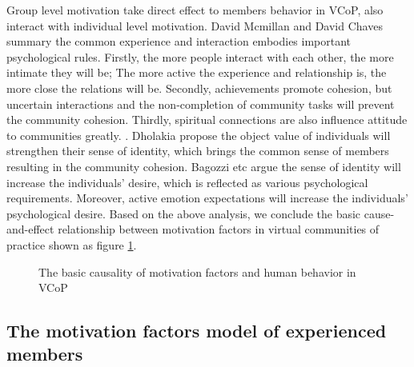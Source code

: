 \documentclass{elsarticle}
\begin{document}
 Group  level motivation take direct effect to members behavior in
 VCoP,  also interact with individual
level motivation. David Mcmillan and David
Chaves summary  the common experience and interaction embodies
important psychological rules. Firstly, the more people interact with each
other, the more intimate they will be; The more active the experience
and relationship is, the more close the relations will
be. Secondly, achievements promote cohesion, but uncertain
interactions and the non-completion of community tasks will prevent
the community cohesion. Thirdly, spiritual connections are also
influence attitude to communities greatly. 
\cite{mcmillan1986scd}. Dholakia propose the object value of individuals will
strengthen their sense of identity, which brings the common sense of
members resulting in the community
cohesion\cite{dholakia2004241}. Bagozzi etc argue the sense of identity will increase the
individuals’ desire, which is reflected as various psychological
requirements. Moreover, active
emotion expectations will increase the individuals’ psychological
desire\cite{richard_p._bagozzi_intentional_2002}.  Based on the above analysis, we conclude the basic
cause-and-effect relationship between motivation factors in virtual
communities of practice shown as figure \ref{fig:cause-and-effect}.
\begin{figure}[htpb]
  \centering
  \label{fig:cause-and-effect}
  \caption{The basic causality of
    motivation factors and human behavior in VCoP}
\end{figure}

\subsection{The motivation factors model of experienced members}
\label{sec:motiv-fact-model}
\end{document}

